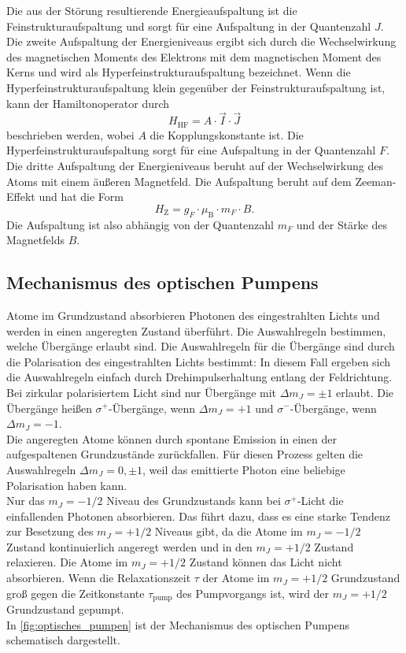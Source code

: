 Die aus der Störung resultierende Energieaufspaltung ist die Feinstrukturaufspaltung und sorgt für eine Aufspaltung in der Quantenzahl $J$.\\
Die zweite Aufspaltung der Energieniveaus ergibt sich durch die Wechselwirkung des magnetischen Moments des Elektrons mit dem magnetischen Moment des Kerns und wird als 
Hyperfeinstrukturaufspaltung bezeichnet. Wenn die Hyperfeinstrukturaufspaltung klein gegenüber der Feinstrukturaufspaltung ist, kann der Hamiltonoperator durch
\begin{equation*}
    H_{\text{HF}} = A \cdot \vec{I} \cdot \vec{J}
\end{equation*}
beschrieben werden, wobei $A$ die Kopplungskonstante ist. Die Hyperfeinstrukturaufspaltung sorgt für eine Aufspaltung in der Quantenzahl $F$.\\
Die dritte Aufspaltung der Energieniveaus beruht auf der Wechselwirkung des Atoms mit einem äußeren Magnetfeld. Die Aufspaltung beruht auf dem Zeeman-Effekt und hat die Form
\begin{equation*}
    H_{\text{Z}} = g_F \cdot \mu_{\text{B}} \cdot m_F \cdot B.
\end{equation*}
Die Aufspaltung ist also abhängig von der Quantenzahl $m_F$ und der Stärke des Magnetfelds $B$.

\subsection{Mechanismus des optischen Pumpens}
\label{subsec:Mechanismus}
Atome im Grundzustand absorbieren Photonen des eingestrahlten Lichts und werden in einen angeregten Zustand überführt. Die Auswahlregeln bestimmen, welche Übergänge erlaubt sind.
Die Auswahlregeln für die Übergänge sind durch die Polarisation des eingestrahlten Lichts bestimmt:
In diesem Fall ergeben sich die Auswahlregeln einfach durch Drehimpulserhaltung entlang der Feldrichtung. Bei zirkular polarisiertem Licht sind nur Übergänge mit $\Delta m_J = \pm 1$ erlaubt. 
Die Übergänge heißen $\sigma^+$-Übergänge, wenn $\Delta m_J = +1$ und $\sigma^-$-Übergänge, wenn $\Delta m_J = -1$.\\
Die angeregten Atome können durch spontane Emission in einen der aufgespaltenen Grundzustände zurückfallen. Für diesen Prozess gelten die Auswahlregeln
$\Delta m_J = 0, \pm 1$, weil das emittierte Photon eine beliebige Polarisation haben kann.\\
Nur das $m_J = -1/2$ Niveau des Grundzustands kann bei $\sigma^+$-Licht die einfallenden Photonen absorbieren. Das führt dazu, dass es eine starke Tendenz zur Besetzung des $m_J = +1/2$ Niveaus gibt,
da die Atome im $m_J = -1/2$ Zustand kontinuierlich angeregt werden und in den $m_J = +1/2$ Zustand relaxieren. Die Atome im $m_J = +1/2$ Zustand können das Licht nicht absorbieren. Wenn die
Relaxationszeit $\tau$ der Atome im $m_J = +1/2$ Grundzustand groß gegen die Zeitkonstante $\tau_{\text{pump}}$ des Pumpvorgangs ist, wird der $m_J = +1/2$ Grundzustand gepumpt.\\
In \autoref{fig:optisches_pumpen} ist der Mechanismus des optischen Pumpens schematisch dargestellt.

